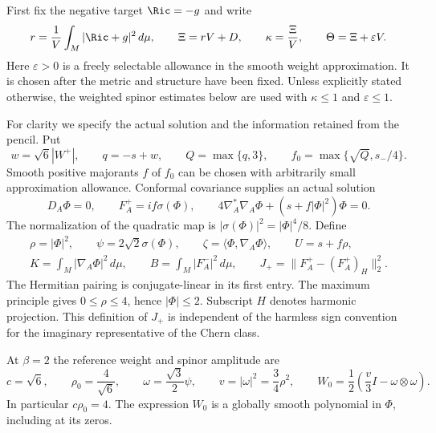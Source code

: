 First fix the negative target $\Ric=-g$ and write
\begin{equation}\label{eq:lc-normalized-error}
 r=\frac1V\int_M|\Ric+g|^2\,d\mu,\qquad
 \Xi=rV+D,\qquad \kappa=\frac{\Xi}{V},\qquad
 \Theta=\Xi+\varepsilon V.
\end{equation}
Here $\varepsilon>0$ is a freely selectable allowance in the smooth
weight approximation.  It is chosen after the metric and structure
have been fixed.  Unless explicitly stated otherwise, the weighted
spinor estimates below are used with $\kappa\le1$ and $\varepsilon\le1$.

For clarity we specify the actual solution and the information retained
from the pencil.  Put
\begin{equation}\label{eq:lc-weight}
 w=\sqrt6|W^+|,\qquad q=-s+w,\qquad Q=\max\{q,3\},\qquad
 f_0=\max\{\sqrt Q,s_-/4\}.
\end{equation}
Smooth positive majorants $f$ of $f_0$ can be chosen with arbitrarily
small approximation allowance.  Conformal covariance supplies an actual
solution
\begin{equation}\label{eq:lc-sw}
 D_A\Phi=0,\qquad F_A^+=if\sigma(\Phi),\qquad
 4\nabla_A^*\nabla_A\Phi+(s+f|\Phi|^2)\Phi=0.
\end{equation}
The normalization of the quadratic map is
$|\sigma(\Phi)|^2=|\Phi|^4/8$.  Define
\begin{equation}\label{eq:lc-spinor-notation}
\begin{gathered}
 \rho=|\Phi|^2,\qquad \psi=2\sqrt2\sigma(\Phi),\qquad
 \zeta=\langle\Phi,\nabla_A\Phi\rangle,\qquad U=s+f\rho,\\
 K=\int_M|\nabla_A\Phi|^2\,d\mu,\qquad
 B=\int_M|F_A^-|^2\,d\mu,\qquad
 J_+=\|F_A^+-(F_A^+)_H\|_2^2.
\end{gathered}
\end{equation}
The Hermitian pairing is conjugate-linear in its first entry.  The
maximum principle gives $0\le\rho\le4$, hence $|\Phi|\le2$.
Subscript $H$ denotes harmonic projection.  This definition of $J_+$
is independent of the harmless sign convention for the imaginary
representative of the Chern class.

At $\beta=2$ the reference weight and spinor amplitude are
\begin{equation}\label{eq:lc-reference}
 c=\sqrt6,\qquad \rho_0=\frac4{\sqrt6},\qquad
 \omega=\frac{\sqrt3}{2}\psi,\qquad
 v=|\omega|^2=\frac34\rho^2,\qquad
 W_0=\frac12\left(\frac v3 I-\omega\otimes\omega\right).
\end{equation}
In particular $c\rho_0=4$.  The expression $W_0$ is a globally smooth
polynomial in $\Phi$, including at its zeros.

